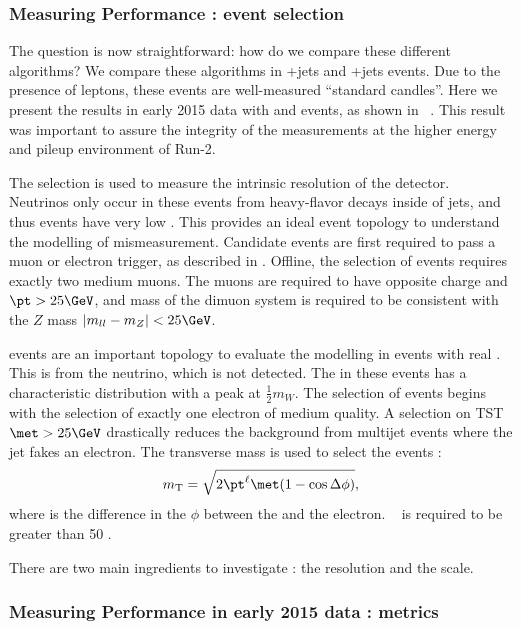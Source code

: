 \subsubsection{Measuring \met Performance : event selection}
\label{subsubsec:met_event_selection}
The question is now straightforward: how do we compare these different algorithms?
We compare these algorithms in \Zll+jets and \Wln+jets events.
Due to the presence of leptons, these events are well-measured ``standard candles''.
Here we present the results in early 2015 data with \Zmm and \Wen events, as shown in ~\cite{ATL-PHYS-PUB-2015-023,ATL-PHYS-PUB-2015-027}.
This result was important to assure the integrity of the \met measurements at the higher energy and pileup environment of Run-2.

The \Zll selection is used to measure the intrinsic \met resolution of the detector.
Neutrinos only occur in these events from heavy-flavor decays inside of jets, and thus \Zll events have very low \met.
This provides an ideal event topology to understand the modelling of \met mismeasurement.
Candidate \Zmm events are first required to pass a muon or electron trigger, as described in .
Offline, the selection of \Zmm events requires exactly two medium muons.
The muons are required to have opposite charge and $\pt > 25 \GeV$, and mass of the dimuon system is required to be consistent with the $Z$ mass $|m_{ll} - m_Z | < 25 \GeV$.

\Wln events are an important topology to evaluate the \met modelling in events with real \met.
This \met is from the neutrino, which is not detected.
The \met in these events has a characteristic distribution with a peak at $\frac{1}{2} m_W$.
The selection of \Wen events begins with the selection of exactly one electron of medium quality.
A selection on TST $\met > 25 \GeV$  drastically reduces the background from multijet events where the jet fakes an electron.
The transverse mass is used to select the \Wen events :
\begin{equation}
  \mT = \sqrt{ 2\pt^{\ell} \met (1-\cos{\deltaPhi}) },
\label{eq:mT}
\end{equation}
where \deltaPhi is the difference in the $\phi$ between the \met and the electron.
\mT~ is required to be greater than 50 \GeV.

There are two main ingredients to investigate : the \met resolution and the \met scale.

\subsubsection{Measuring \met Performance in early 2015 data : metrics}

